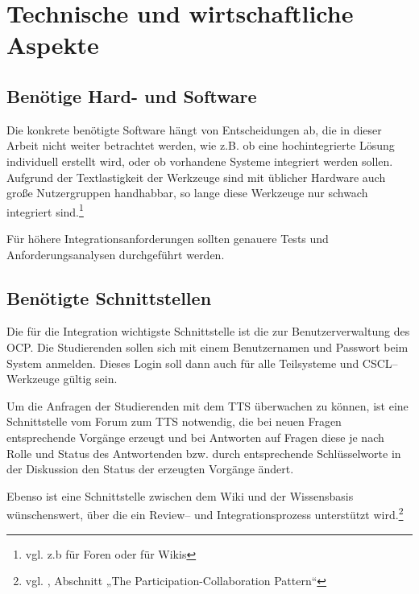 

\section{Technische und wirtschaftliche Aspekte} %
\label{sec:technische_und_wirtschaftliche_aspekte}

\subsection{Benötige Hard- und Software} %
\label{sub:benotige_hard_und_software}
Die konkrete benötigte Software hängt von Entscheidungen ab, die in dieser Arbeit nicht weiter betrachtet werden, wie z.B. ob eine hochintegrierte Lösung individuell erstellt wird, oder ob vorhandene Systeme integriert werden sollen. Aufgrund der Textlastigkeit der Werkzeuge sind mit üblicher Hardware auch große Nutzergruppen handhabbar, so lange diese Werkzeuge nur schwach integriert sind.\footnote{vgl. z.b \cite{phpbblarge} für Foren oder \cite{dwlarge} für Wikis}

Für höhere Integrationsanforderungen sollten genauere Tests und Anforderungsanalysen durchgeführt werden.

\subsection{Benötigte Schnittstellen} %
\label{sub:benotigte_schnittstellen}
Die für die Integration wichtigste Schnittstelle ist die zur Benutzerverwaltung des \ac{OCP}. Die Studierenden sollen sich mit einem Benutzernamen und Passwort beim System anmelden. Dieses Login soll dann auch für alle Teilsysteme und CSCL–Werkzeuge gültig sein.

Um die Anfragen der Studierenden mit dem \ac{TTS} überwachen zu können, ist eine Schnittstelle vom Forum zum \ac{TTS} notwendig, die bei neuen Fragen entsprechende Vorgänge erzeugt und bei Antworten auf Fragen diese je nach Rolle und Status des Antwortenden bzw. durch entsprechende Schlüsselworte in der Diskussion den Status der erzeugten Vorgänge ändert.

Ebenso ist eine Schnittstelle zwischen dem Wiki und der Wissensbasis wünschenswert, über die ein Review-- und Integrationsprozess unterstützt wird.\footnote{vgl. \cite{governor}, Abschnitt „The Participation-Collaboration Pattern“}

